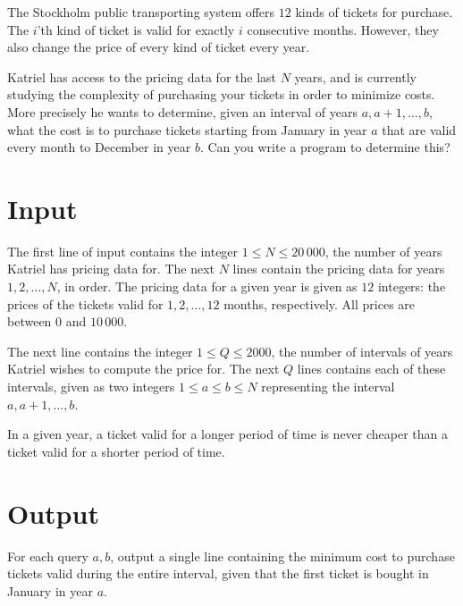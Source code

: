 The Stockholm public transporting system offers $12$ kinds of tickets for purchase.
The $i$'th kind of ticket is valid for exactly $i$ consecutive months.
However, they also change the price of every kind of ticket every year.

Katriel has access to the pricing data for the last $N$ years, and is currently studying the complexity of purchasing your tickets in order to minimize costs.
More precisely he wants to determine, given an interval of years $a, a + 1, \dots, b$, what the cost is to purchase tickets starting from January in year $a$ that are valid every month to December in year $b$.
Can you write a program to determine this?

\section*{Input}
The first line of input contains the integer $1 \le N \le 20\,000$, the number of years Katriel has pricing data for.
The next $N$ lines contain the pricing data for years $1, 2, \dots, N$, in order.
The pricing data for a given year is given as $12$ integers: the prices of the tickets valid for $1, 2, \dots, 12$ months, respectively.
All prices are between $0$ and $10\,000$.

The next line contains the integer $1 \le Q \le 2000$, the number of intervals of years Katriel wishes to compute the price for.
The next $Q$ lines contains each of these intervals, given as two integers $1 \le a \le b \le N$ representing the interval $a, a + 1, \dots, b$.

In a given year, a ticket valid for a longer period of time is never cheaper than a ticket valid for a shorter period of time.

\section*{Output}
For each query $a, b$, output a single line containing the minimum cost to purchase tickets valid during the entire interval, given that the first ticket is bought in January in year $a$.
